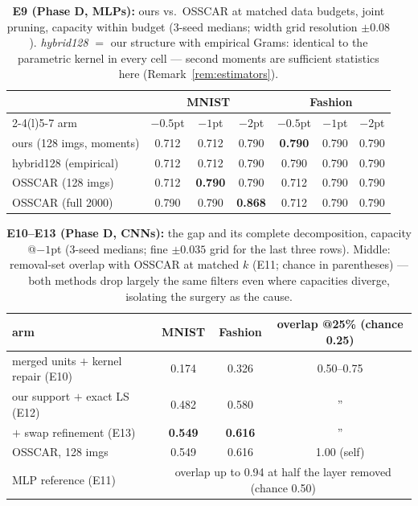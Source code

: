\documentclass[11pt]{article}
\theoremstyle{remark}
\begin{document}
\begin{table}[t]
\centering\small
\caption{\textbf{E9 (Phase D, MLPs):} ours vs.\ OSSCAR at matched data
budgets, joint pruning, capacity within budget (3-seed medians; width grid
resolution $\pm 0.08$). \emph{hybrid128} $=$ our structure with empirical
Grams: identical to the parametric kernel in every cell --- second moments
are sufficient statistics here (Remark~\ref{rem:estimators}).}
\label{tab:phaseD}
\begin{tabular}{@{}lccc ccc@{}}
\toprule
& \multicolumn{3}{c}{MNIST} & \multicolumn{3}{c}{Fashion} \\
\cmidrule(lr){2-4}\cmidrule(l){5-7}
arm & $-0.5$pt & $-1$pt & $-2$pt & $-0.5$pt & $-1$pt & $-2$pt \\
\midrule
ours (128 imgs, moments)  & 0.712 & 0.712 & 0.790 & \textbf{0.790} & 0.790 & 0.790 \\
hybrid128 (empirical)     & 0.712 & 0.712 & 0.790 & 0.790 & 0.790 & 0.790 \\
OSSCAR (128 imgs)         & 0.712 & \textbf{0.790} & 0.790 & 0.712 & 0.790 & 0.790 \\
OSSCAR (full 2000)        & 0.790 & 0.790 & \textbf{0.868} & 0.712 & 0.790 & 0.790 \\
\bottomrule
\end{tabular}
\end{table}

\begin{table}[t]
\centering\small
\caption{\textbf{E10--E13 (Phase D, CNNs):} the gap and its complete
decomposition, capacity @$-1$pt (3-seed medians; fine $\pm0.035$ grid for
the last three rows). Middle: removal-set overlap with OSSCAR at matched
$k$ (E11; chance in parentheses) --- both methods drop largely the same
filters even where capacities diverge, isolating the surgery as the cause.}
\label{tab:cnn}
\begin{tabular}{@{}lcc c@{}}
\toprule
arm & MNIST & Fashion & overlap @25\% (chance 0.25) \\
\midrule
merged units $+$ kernel repair (E10) & 0.174 & 0.326 & 0.50--0.75 \\
our support $+$ exact LS (E12)       & 0.482 & 0.580 & '' \\
$+$ swap refinement (E13)            & \textbf{0.549} & \textbf{0.616} & '' \\
OSSCAR, 128 imgs                     & 0.549 & 0.616 & 1.00 (self) \\
\midrule
MLP reference (E11) & \multicolumn{3}{c}{overlap up to 0.94 at half the
layer removed (chance 0.50)} \\
\bottomrule
\end{tabular}
\end{table}
\end{document}
